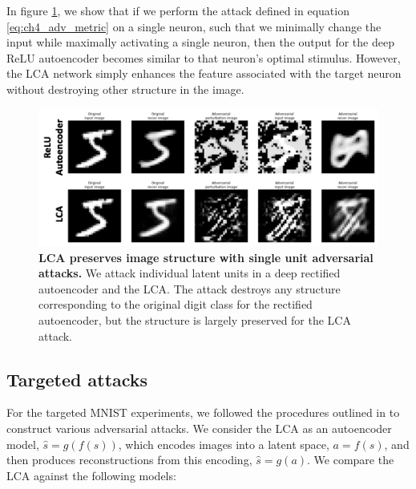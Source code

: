 In figure \ref{fig:ch4_marzi_unit_relu_lca}, we show that if we perform the attack defined in equation \eqref{eq:ch4_adv_metric} on a single neuron, such that we minimally change the input while maximally activating a single neuron, then the output for the deep ReLU autoencoder becomes similar to that neuron's optimal stimulus. However, the LCA network simply enhances the feature associated with the target neuron without destroying other structure in the image.

\begin{figure}[h]
    \centering
    \includegraphics[width=\textwidth]{figures/adv_marzi_unit_relu_lca.png}
    \caption{\textbf{LCA preserves image structure with single unit adversarial attacks.} We attack individual latent units in a deep rectified autoencoder and the LCA. The attack destroys any structure corresponding to the original digit class for the rectified autoencoder, but the structure is largely preserved for the LCA attack.}
    \label{fig:ch4_marzi_unit_relu_lca}
\end{figure}


\subsection{Targeted attacks}\label{sec:ch4_mnist_experiments}
For the targeted MNIST experiments, we followed the procedures outlined in \parencite{kos2018adversarial, kurakin2016adversarial, carlini2017towards} to construct various adversarial attacks. We consider the LCA as an autoencoder model, $\hat{s}=g(f(s))$, which encodes images into a latent space, $a=f(s)$, and then produces reconstructions from this encoding, $\hat{s}=g(a)$. We compare the LCA against the following models:

